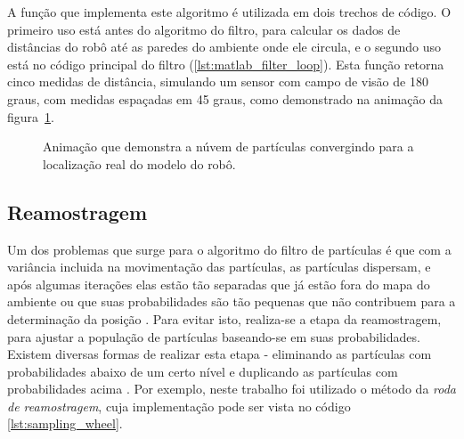 \documentclass[
	12pt,				%
	openright,			%
	oneside,			%
	a4paper,			%
	english,			%
	french,				%
	spanish,			%
	brazil,				%
	]{abntex2}
\newcommand\todo[1]{~\newline{\color{red}\framebox[\columnwidth]{\parbox{.95\linewidth}{TODO: #1}}}~\newline}
\newcommand\todo[1]{}
\begin{document}

%

A função que implementa este algoritmo é utilizada em dois trechos de código. O primeiro uso está antes do algoritmo do filtro, para calcular os dados de distâncias do robô até as paredes do ambiente onde ele circula, e o segundo uso está no código principal do filtro (\ref{lst:matlab_filter_loop}). Esta função retorna cinco medidas de distância, simulando um sensor com campo de visão de 180 graus, com medidas espaçadas em 45 graus, como demonstrado na animação da figura~\ref{fig:ambiente}.


\begin{figure}
    \centering
    \caption{Animação que demonstra a núvem de partículas convergindo para a localização real do modelo do robô.}
    \label{fig:ambiente}
\end{figure}


\subsection{Reamostragem}
\label{subsec:reamostragem}
Um dos problemas que surge para o algoritmo do filtro de partículas é que com a variância incluida na movimentação das partículas, as partículas dispersam, e após algumas iterações elas estão tão separadas que já estão fora do mapa do ambiente ou que suas probabilidades são tão pequenas que não contribuem para a determinação da posição \cite{pftuto}. Para evitar isto, realiza-se a etapa da reamostragem, para ajustar a população de partículas baseando-se em suas probabilidades. Existem diversas formas de realizar esta etapa - eliminando as partículas com probabilidades abaixo de um certo nível e duplicando as partículas com probabilidades acima \cite{pftuto}. Por exemplo, neste trabalho foi utilizado o método da \emph{roda de reamostragem}, cuja implementação pode ser vista no código \ref{lst:sampling_wheel}.\newpage
\end{document}
